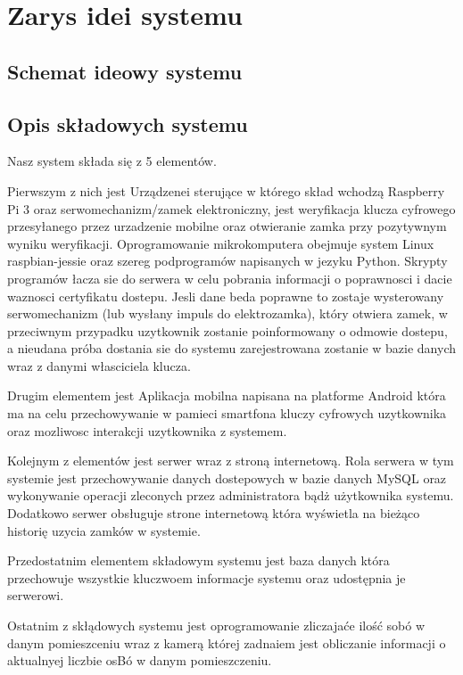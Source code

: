 % 
\newpage\section{Zarys idei systemu \textsl{\NazwaSys}}\label{sec:ideasystemu}
\subsection{Schemat ideowy systemu \textsl{\NazwaSys}}

\newpage
\subsection{Opis składowych systemu}
Nasz system składa się z 5 elementów.

Pierwszym z nich jest Urządzenei sterujące  w którego skład wchodzą  Raspberry
Pi 3 oraz serwomechanizm/zamek elektroniczny, jest weryfikacja klucza cyfrowego
przesyłanego przez urzadzenie mobilne oraz otwieranie zamka przy pozytywnym
wyniku weryfikacji.
Oprogramowanie mikrokomputera obejmuje system Linux raspbian-jessie oraz
szereg podprogramów napisanych w jezyku Python. Skrypty programów łacza sie
do serwera w celu pobrania informacji o poprawnosci i dacie waznosci certyfikatu
dostepu. Jesli dane beda poprawne to zostaje wysterowany serwomechanizm (lub
wysłany impuls do elektrozamka), który otwiera zamek, w przeciwnym przypadku
uzytkownik zostanie poinformowany o odmowie dostepu, a nieudana próba dostania
sie do systemu zarejestrowana zostanie w bazie danych wraz z danymi własciciela
klucza.

Drugim elementem jest 
Aplikacja mobilna napisana na platforme Android która ma na celu
przechowywanie w pamieci smartfona kluczy cyfrowych uzytkownika oraz mozliwosc
interakcji uzytkownika z systemem.

Kolejnym z elementów jest serwer wraz z stroną internetową.
Rola serwera w tym systemie jest przechowywanie danych dostepowych w
bazie danych MySQL oraz wykonywanie operacji zleconych przez administratora bądż użytkownika systemu. Dodatkowo serwer obsługuje strone internetową która wyświetla na bieżąco historię uzycia zamków w systemie.

Przedostatnim elementem składowym systemu jest baza danych która przechowuje wszystkie kluczwoem informacje systemu oraz udostępnia je serwerowi.

Ostatnim z skłądowych systemu jest oprogramowanie zliczajaće ilość sobó w danym pomieszceniu wraz z kamerą której zadnaiem jest obliczanie informacji o aktualnyej liczbie osBó w danym pomieszczeniu. 

